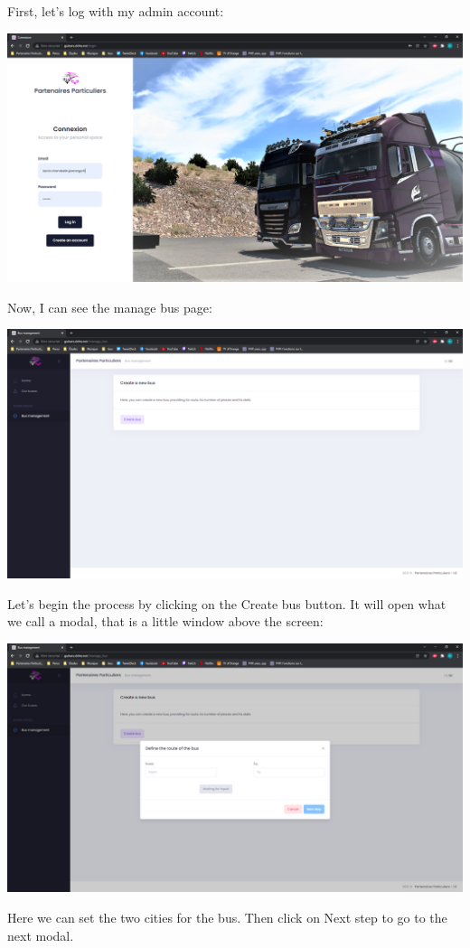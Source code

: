 \documentclass[12pt,a4paper,openany]{book}
\begin{document}
First, let's log with my admin account:
\begin{center}
	\includegraphics[scale=0.35]{Figs/fig8}
\end{center}
Now, I can see the manage bus page:
\begin{center}
	\includegraphics[scale=0.35]{Figs/fig9}
\end{center}
Let's begin the process by clicking on the Create bus button. It will open what we call a modal, that is a little window above the screen:
\begin{center}
	\includegraphics[scale=0.35]{Figs/fig10}
\end{center}
Here we can set the two cities for the bus. Then click on Next step to go to the next modal.
\end{document}
